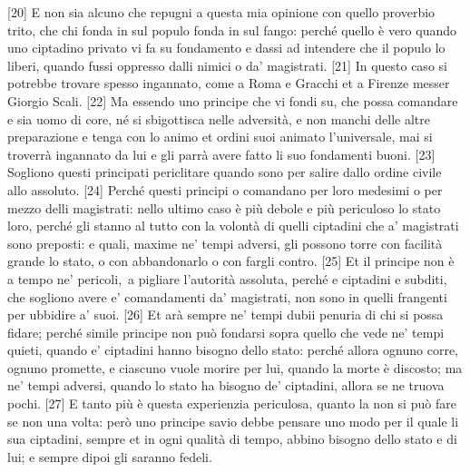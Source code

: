{[}20{]}
E non sia alcuno che repugni a questa mia opinione con quello proverbio
trito, che chi fonda in sul populo fonda in sul fango: perché quello è
vero quando uno ciptadino privato vi fa su fondamento e dassi ad
intendere che il populo lo liberi, quando fussi oppresso dalli nimici o
da' magistrati. {[}21{]} In questo caso si potrebbe trovare spesso
ingannato, come a Roma e Gracchi et a Firenze messer Giorgio Scali.
{[}22{]} Ma essendo uno principe che vi fondi su, che possa comandare e
sia uomo di core, né si sbigottisca nelle adversità, e non manchi delle
altre preparazione e tenga con lo animo et ordini suoi animato
l'universale, mai si troverrà ingannato da lui e gli parrà avere fatto
li suo fondamenti buoni. {[}23{]} Sogliono questi principati periclitare
quando sono per salire dallo ordine civile allo assoluto. {[}24{]}
Perché questi principi o comandano per loro medesimi o per mezzo delli
magistrati: nello ultimo caso è più debole e più periculoso lo stato
loro, perché gli stanno al tutto con la volontà di quelli ciptadini che
a' magistrati sono preposti: e quali, maxime ne' tempi adversi, gli
possono torre con facilità grande lo stato, o con abbandonarlo o con
fargli contro. {[}25{]} Et il principe non è a tempo ne' pericoli,\est\ a
pigliare l'autorità assoluta, perché e ciptadini e subditi, che sogliono
avere e' comandamenti da' magistrati, non sono in quelli frangenti per
ubbidire a' suoi. {[}26{]} Et arà sempre ne' tempi dubii penuria di chi
si possa fidare; perché simile principe non può fondarsi sopra quello
che vede ne' tempi quieti, quando e' ciptadini hanno bisogno dello
stato: perché allora ognuno corre, ognuno promette, e ciascuno vuole
morire per lui, quando la morte è discosto; ma ne' tempi adversi, quando
lo stato ha bisogno de' ciptadini, allora se ne truova pochi. {[}27{]} E
tanto più è questa experienzia periculosa, quanto la non si può fare se
non una volta: però uno principe savio debbe pensare uno modo per il
quale li sua ciptadini, sempre et in ogni qualità di tempo, abbino
bisogno dello stato e di lui; e sempre dipoi gli saranno fedeli.


